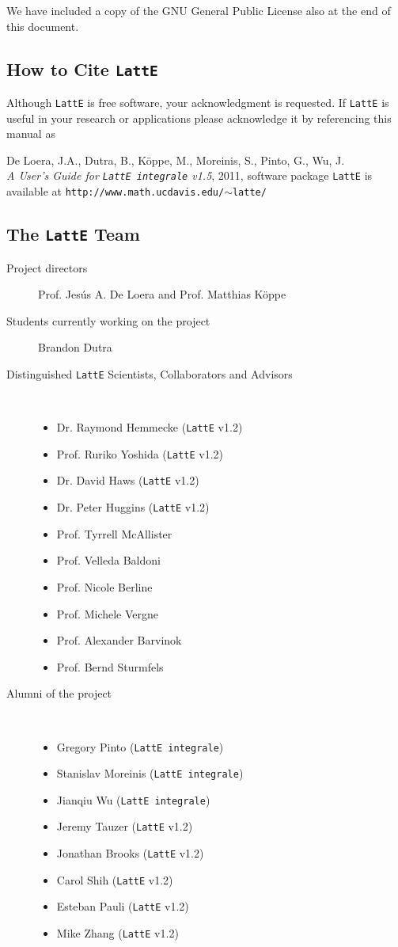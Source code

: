 \documentclass{article}
\newcommand{\latte}{{\tt LattE}\xspace}
\newcommand{\latteInt}{{\tt LattE integrale}\xspace}
\newcommand{\latteV}{v1.5}
\begin{document}
We have included a copy of the GNU General Public License also at the
end of this document.

\subsection{How to Cite {\tt LattE}}

Although {\tt LattE} is free software, your acknowledgment
is requested.  If {\tt LattE} is useful in your research or
applications please acknowledge it by referencing this manual as

De Loera, J.A., Dutra, B., K\"oppe, M., Moreinis, S.,
Pinto, G., Wu, J.\\ 
{\em A User's Guide for {\tt LattE integrale} \latteV}, 2011, 
software package \latte is available at 
{\tt http://www.math.ucdavis.edu/$\sim$latte/}
	
\subsection{The {\tt LattE} Team}
\begin{description}
\item[Project directors]  Prof. Jes\'us A. De Loera and Prof. Matthias K\"oppe
\item[Students currently working on the project] Brandon Dutra
\item[Distinguished \latte Scientists, Collaborators and Advisors] \hfill \\
	\begin{itemize} 
		\item Dr. Raymond Hemmecke (\latte v1.2)
		\item Prof. Ruriko Yoshida (\latte v1.2)
		\item Dr. David Haws (\latte v1.2)
		\item Dr. Peter Huggins (\latte v1.2)
		\item Prof. Tyrrell McAllister
		\item Prof. Velleda Baldoni
		\item Prof. Nicole Berline
		\item Prof. Michele Vergne
		\item Prof. Alexander Barvinok
		\item Prof. Bernd Sturmfels 
	\end{itemize}
\item[Alumni of the project]	\hfill \\
	\begin{itemize}
		\item Gregory Pinto	(\latteInt)
		\item Stanislav Moreinis (\latteInt)
		\item Jianqiu Wu (\latteInt)
		\item Jeremy Tauzer (\latte v1.2)
		\item Jonathan Brooks (\latte v1.2)
		\item Carol Shih (\latte v1.2)
		\item Esteban Pauli (\latte v1.2)
		\item Mike Zhang	(\latte v1.2)
	\end{itemize}
\end{description}
\end{document}
